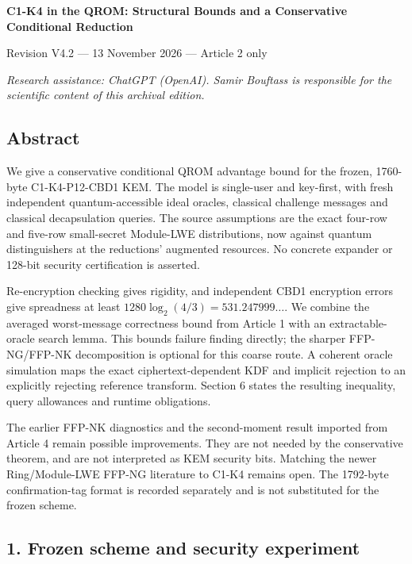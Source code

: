 \documentclass[11pt,a4paper]{article}
\begin{document}
{\LARGE\bfseries C1-K4 in the QROM: Structural Bounds and a Conservative Conditional Reduction\par}
{\small Revision V4.2 — 13 November 2026 — Article 2 only\par}
{\small\itshape Research assistance: ChatGPT (OpenAI). Samir Bouftass is responsible for the scientific content of this archival edition.\par}
\medskip
\subsection{Abstract}\label{abstract}

We give a conservative conditional QROM advantage bound for the frozen, 1760-byte C1-K4-P12-CBD1 KEM. The model is single-user and key-first, with fresh independent quantum-accessible ideal oracles, classical challenge messages and classical decapsulation queries. The source assumptions are the exact four-row and five-row small-secret Module-LWE distributions, now against quantum distinguishers at the reductions' augmented resources. No concrete expander or 128-bit security certification is asserted.

Re-encryption checking gives rigidity, and independent CBD1 encryption errors give spreadness at least \(1280\log_2(4/3)=531.247999\ldots\). We combine the averaged worst-message correctness bound from Article 1 with an extractable-oracle search lemma. This bounds failure finding directly; the sharper FFP-NG/FFP-NK decomposition is optional for this coarse route. A coherent oracle simulation maps the exact ciphertext-dependent KDF and implicit rejection to an explicitly rejecting reference transform. Section 6 states the resulting inequality, query allowances and runtime obligations.

The earlier FFP-NK diagnostics and the second-moment result imported from Article 4 remain possible improvements. They are not needed by the conservative theorem, and are not interpreted as KEM security bits. Matching the newer Ring/Module-LWE FFP-NG literature to C1-K4 remains open. The 1792-byte confirmation-tag format is recorded separately and is not substituted for the frozen scheme.

\subsection{1. Frozen scheme and security experiment}\label{frozen-scheme-and-security-experiment}
\end{document}
